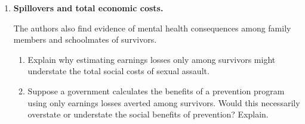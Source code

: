 \documentclass[12pt]{article}
\begin{document}
\begin{enumerate}
\begin{enumerate}
\item Suppose more economically disadvantaged survivors
are less likely to report an assault.
Why could this affect the interpretation of the
study's estimates? Would the direction of bias
necessarily be known?

\vspace{4cm}


\vspace{4cm}

\end{enumerate}

\vspace{1cm}

\item \textbf{Spillovers and total economic costs.}

The authors also find evidence of mental health
consequences among family members and schoolmates
of survivors.

\begin{enumerate}

\item Explain why estimating earnings losses only
among survivors might understate the total social
costs of sexual assault.

\vspace{4cm}

\item Suppose a government calculates the benefits
of a prevention program using only earnings losses
averted among survivors.
Would this necessarily overstate or understate the
social benefits of prevention? Explain.


\end{enumerate}
\end{enumerate}
\end{document}
